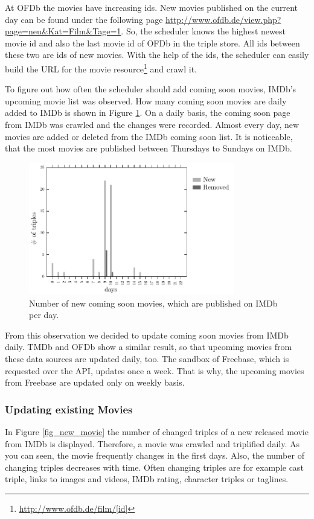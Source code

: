 At OFDb the movies have increasing ids.
New movies published on the current day can be found under the following page \url{http://www.ofdb.de/view.php?page=neu&Kat=Film&Tage=1}.
So, the scheduler knows the highest newest movie id and also the last movie id of OFDb in the triple store.
All ids between these two are ids of new movies.
With the help of the ids, the scheduler can easily build the URL for the movie resource\footnote{\url{http://www.ofdb.de/film/[id]}} and crawl it.

To figure out how often the scheduler should add coming soon movies, IMDb's upcoming movie list was observed.
How many coming soon movies are daily added to IMDb is shown in Figure \ref{fig_coming_soon_movie}.
On a daily basis, the coming soon page from IMDb was crawled and the changes were recorded.
Almost every day, new movies are added or deleted from the IMDb coming soon list.
It is noticeable, that the most movies are published between Thursdays to Sundays on IMDb.

\begin{figure}[h!]
  \begin{center}
  \includegraphics[width=0.8\textwidth]{images/updating_1.pdf}
  \end{center}
  \caption{Number of new coming soon movies, which are published on IMDb per day.}
  \label{fig_coming_soon_movie}
\end{figure}

From this observation we decided to update coming soon movies from IMDb daily.
TMDb and OFDb show a similar result, so that upcoming movies from these data sources are updated daily, too. The sandbox of Freebase, which is requested over the API, updates once a week. That is why, the upcoming movies from Freebase are updated only on weekly basis.

\subsubsection{Updating existing Movies}
In Figure \ref{fig_new_movie} the number of changed triples of a new released movie from IMDb is displayed.
Therefore, a movie was crawled and triplified daily.
As you can seen, the movie frequently changes in the first days.
Also, the number of changing triples decreases with time.
Often changing triples are for example cast triple, links to images and videos, IMDb rating, character triples or taglines.

